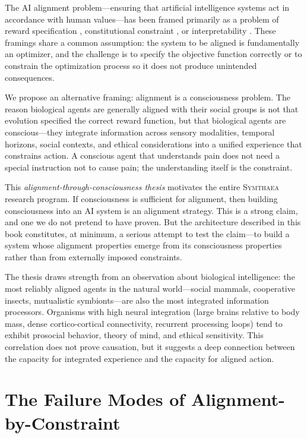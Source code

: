 \documentclass[12pt]{book}
\newcommand{\symthaea}{\textsc{Symthaea}}
\begin{document}
The AI alignment problem---ensuring that artificial intelligence systems act in accordance with human values---has been framed primarily as a problem of reward specification \citep{russell2019human}, constitutional constraint \citep{bai2022constitutional}, or interpretability \citep{olah2020zoom}. These framings share a common assumption: the system to be aligned is fundamentally an optimizer, and the challenge is to specify the objective function correctly or to constrain the optimization process so it does not produce unintended consequences.

We propose an alternative framing: alignment is a consciousness problem. The reason biological agents are generally aligned with their social groups is not that evolution specified the correct reward function, but that biological agents are conscious---they integrate information across sensory modalities, temporal horizons, social contexts, and ethical considerations into a unified experience that constrains action. A conscious agent that understands pain does not need a special instruction not to cause pain; the understanding itself is the constraint.

This \textit{alignment-through-consciousness thesis} motivates the entire \symthaea{} research program. If consciousness is sufficient for alignment, then building consciousness into an AI system is an alignment strategy. This is a strong claim, and one we do not pretend to have proven. But the architecture described in this book constitutes, at minimum, a serious attempt to test the claim---to build a system whose alignment properties emerge from its consciousness properties rather than from externally imposed constraints.

The thesis draws strength from an observation about biological intelligence: the most reliably aligned agents in the natural world---social mammals, cooperative insects, mutualistic symbionts---are also the most integrated information processors. Organisms with high neural integration (large brains relative to body mass, dense cortico-cortical connectivity, recurrent processing loops) tend to exhibit prosocial behavior, theory of mind, and ethical sensitivity. This correlation does not prove causation, but it suggests a deep connection between the capacity for integrated experience and the capacity for aligned action.

\section{The Failure Modes of Alignment-by-Constraint}
\end{document}
